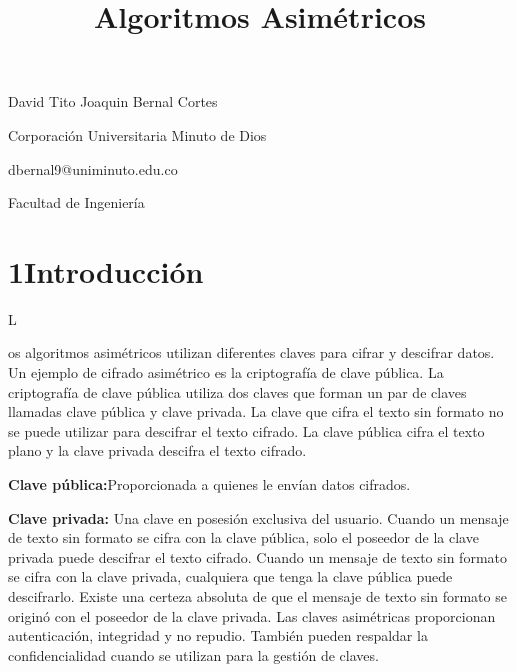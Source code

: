 \documentclass[12pt]{article}
\title{Algoritmos Asimétricos }
\date{}
\begin{document}
\maketitle
\par

David Tito Joaquin Bernal Cortes\par

Corporación Universitaria Minuto de Dios \par

dbernal9@uniminuto.edu.co\par

Facultad de Ingeniería\par


\vspace{\baselineskip}
\section*{1\hspace*{10pt}Introducción}
{\fontsize{16pt}{19.2pt}\selectfont L\par}os algoritmos asimétricos utilizan diferentes claves para cifrar y descifrar datos. Un ejemplo de cifrado asimétrico es la criptografía de clave pública. La criptografía de clave pública utiliza dos claves que forman un par de claves llamadas clave pública y clave privada. La clave que cifra el texto sin formato no se puede utilizar para descifrar el texto cifrado. La clave pública cifra el texto plano y la clave privada descifra el texto cifrado.\par


\vspace{\baselineskip}
\textbf{Clave pública:}Proporcionada a quienes le envían datos cifrados.\par

\textbf{Clave privada:} Una clave en posesión exclusiva del usuario. Cuando un mensaje de texto sin formato se cifra con la clave pública, solo el poseedor de la clave privada puede descifrar el texto cifrado. Cuando un mensaje de texto sin formato se cifra con la clave privada, cualquiera que tenga la clave pública puede descifrarlo. Existe una certeza absoluta de que el mensaje de texto sin formato se originó con el poseedor de la clave privada. Las claves asimétricas proporcionan autenticación, integridad y no repudio. También pueden respaldar la confidencialidad cuando se utilizan para la gestión de claves.\par
\end{document}
